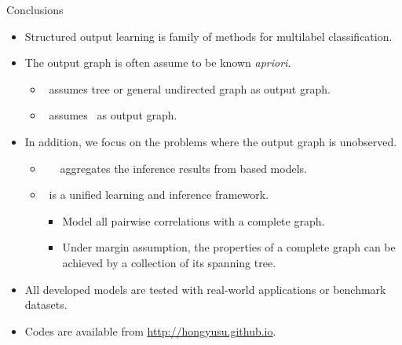 \documentclass[first=dgreen,second=purple,logo=red]{aaltoslides}
\begin{document}
%
\begin{frame}{Conclusions}
	\begin{itemize}\footnotesize
		\item Structured output learning is family of methods for multilabel classification.
		\item The output graph is often assume to be known {\em apriori}.
		\begin{itemize}\footnotesize
			\item \mmcrf\ assumes tree or general undirected graph as output graph.
			\item \spin\ assumes \daggraph\ as output graph.
		\end{itemize}
		\item In addition, we focus on the problems where the output graph is unobserved.
		\begin{itemize}\footnotesize
			\item \mve\, \amm\, \mam\ aggregates the inference results from based models.
			\item \rta\ is a unified learning and inference framework.
			\begin{itemize}\scriptsize
				\item Model all pairwise correlations with a complete graph.
				\item Under margin assumption, the properties of a complete graph can be achieved by a collection of its spanning tree.
			\end{itemize} 
		\end{itemize}
		\item All developed models are tested with real-world applications or benchmark datasets.
		\item Codes are available from \href{http://hongyusu.github.io}{http://hongyusu.github.io}.
	\end{itemize}
\end{frame}
\end{document}
